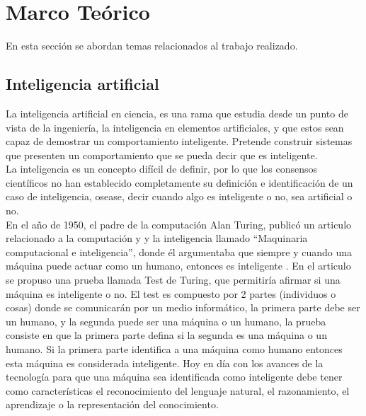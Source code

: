 \documentclass[twoside,spanish,ESP,MSc]{plantillaLabUPV}
\theoremstyle{definition}
\begin{document}


\chapter{Marco Teórico} \label{chap:marcoteori} 

En esta sección se abordan temas relacionados al trabajo realizado.




\section{Inteligencia artificial}

La inteligencia artificial en ciencia, es una rama que estudia desde un punto de vista de la ingeniería, la inteligencia en elementos artificiales, y que estos sean capaz de demostrar un comportamiento inteligente. Pretende construir sistemas que presenten un comportamiento que se pueda decir que es inteligente.\\


La inteligencia es un concepto difícil de definir, por lo que los consensos científicos no han establecido completamente su definición e identificación de un caso de inteligencia, osease, decir cuando algo es inteligente o no, sea artificial o no.\\

En el año de 1950, el padre de la computación Alan Turing, publicó un articulo relacionado a la computación y y la inteligencia llamado ``Maquinaria computacional e inteligencia'', donde él argumentaba que siempre y cuando una máquina puede actuar como un humano, entonces es inteligente \cite{iabook}. En el articulo se propuso una prueba llamada Test de Turing, que permitiría afirmar si una máquina es inteligente o no. El test es compuesto por 2 partes (individuos o cosas) donde se comunicarán por un medio informático, la primera parte debe ser un humano, y la segunda puede ser una máquina o un humano, la prueba consiste en que la primera parte defina si la segunda es una máquina o un humano. Si la primera parte identifica a una máquina como humano entonces esta máquina es considerada inteligente. Hoy en día con los avances de la tecnología para que una máquina sea identificada como inteligente debe tener como características el reconocimiento del lenguaje natural, el razonamiento, el aprendizaje o la representación del conocimiento.\\
\end{document}
